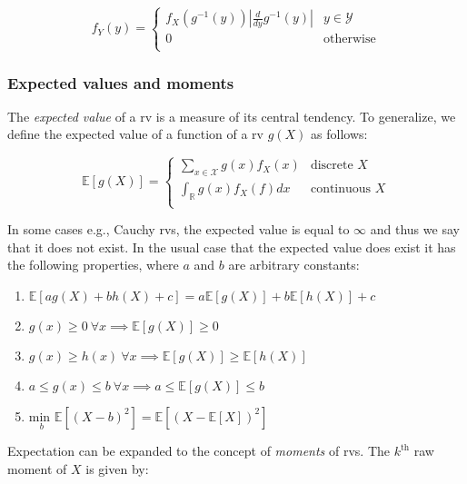 \documentclass{report}
\begin{document}
\begin{equation}\label{eq:pdf-of-transformation}
    f_Y(y) = \begin{cases}
        f_X\left(g^{-1}(y)\right) \left|\frac{d}{dy}g^{-1}(y)\right| & y \in \mathcal{Y} \\
        0 & \text{otherwise} \\
    \end{cases}
\end{equation}

\subsubsection{Expected values and moments}

The \textit{expected value} of a \gls{rv} is a measure of its central tendency. To generalize, we define the expected value of a function of a \gls{rv} $g(X)$ as follows:

\begin{equation}\label{eq:expected-value}
    \mathbb{E}[g(X)] = \begin{cases}
        \sum_{x \in \mathcal{X}} g(x) f_X(x) & \text{discrete } X \\
        \int_{\mathbb{R}} g(x) f_X(f) dx & \text{continuous } X \\
    \end{cases}
\end{equation}

In some cases e.g., Cauchy \glspl{rv}, the expected value is equal to $\infty$ and thus we say that it does not exist. In the usual case that the expected value does exist it has the following properties, where $a$ and $b$ are arbitrary constants:

\begin{enumerate}
    \item $\mathbb{E}[ag(X) + bh(X) + c] = a\mathbb{E}[g(X)] + b\mathbb{E}[h(X)] + c$
    \item $g(x) \geq 0 \: \forall x \implies \mathbb{E}[g(X)] \geq 0$ 
    \item $g(x) \geq h(x) \: \forall x \implies \mathbb{E}[g(X)] \geq \mathbb{E}[h(X)]$
    \item $a \leq g(x) \leq b \: \forall x \implies a \leq \mathbb{E}[g(X)] \leq b$
    \item $\underset{b}{\text{min }} \mathbb{E}\left[(X - b)^2\right] = \mathbb{E}\left[(X - \mathbb{E}[X])^2\right]$
\end{enumerate}

Expectation can be expanded to the concept of \textit{moments} of \glspl{rv}. The $k^{\text{th}}$ raw moment of $X$ is given by:
\end{document}

